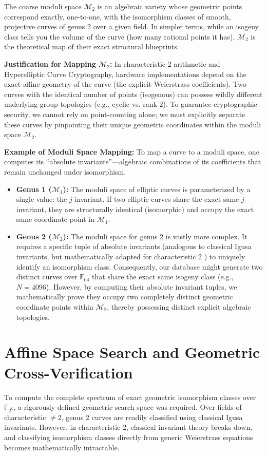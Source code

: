 \documentclass[11pt,letterpaper]{article}
\begin{document}
	The coarse moduli space $\mathcal{M}_2$ is an algebraic variety whose geometric points correspond exactly, one-to-one, with the isomorphism classes of smooth, projective curves of genus 2 over a given field. In simpler terms, while an isogeny class tells you the volume of the curve (how many rational points it has), $\mathcal{M}_2$ is the theoretical map of their exact structural blueprints.
	
	\textbf{Justification for Mapping $\mathcal{M}_2$:} In characteristic 2 arithmetic and Hyperelliptic Curve Cryptography, hardware implementations depend on the exact affine geometry of the curve (the explicit Weierstrass coefficients). Two curves with the identical number of points (isogenous) can possess wildly different underlying group topologies (e.g., cyclic vs. rank-2). To guarantee cryptographic security, we cannot rely on point-counting alone; we must explicitly separate these curves by pinpointing their unique geometric coordinates within the moduli space $\mathcal{M}_2$.
	
	\textbf{Example of Moduli Space Mapping:} 
	To map a curve to a moduli space, one computes its ``absolute invariants''---algebraic combinations of its coefficients that remain unchanged under isomorphism.
	\begin{itemize}
		\item \textbf{Genus 1 ($\mathcal{M}_1$):} The moduli space of elliptic curves is parameterized by a single value: the $j$-invariant. If two elliptic curves share the exact same $j$-invariant, they are structurally identical (isomorphic) and occupy the exact same coordinate point in $\mathcal{M}_1$.
		\item \textbf{Genus 2 ($\mathcal{M}_2$):} The moduli space for genus 2 is vastly more complex. It requires a specific tuple of absolute invariants (analogous to classical Igusa invariants, but mathematically adapted for characteristic 2 \cite{Cardona2005}) to uniquely identify an isomorphism class. Consequently, our database might generate two distinct curves over $\mathbb{F}_{64}$ that share the exact same isogeny class (e.g., $N=4096$). However, by computing their absolute invariant tuples, we mathematically prove they occupy two completely distinct geometric coordinate points within $\mathcal{M}_2$, thereby possessing distinct explicit algebraic topologies.
	\end{itemize}
	
	\section{Affine Space Search and Geometric Cross-Verification}
	To compute the complete spectrum of exact geometric isomorphism classes over $\mathbb{F}_{2^k}$, a rigorously defined geometric search space was required. Over fields of characteristic $\neq 2$, genus 2 curves are readily classified using classical Igusa invariants. However, in characteristic 2, classical invariant theory breaks down, and classifying isomorphism classes directly from generic Weierstrass equations becomes mathematically intractable.
	
\end{document}
